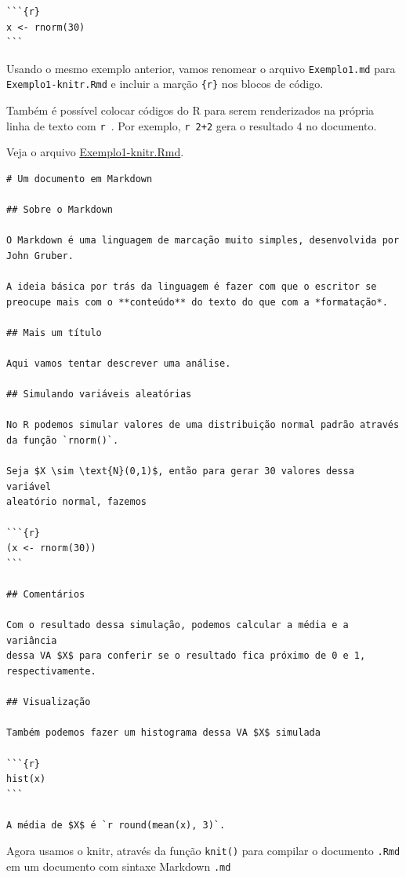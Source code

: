\documentclass[10pt,a4paper]{book}
\begin{document}
\begin{verbatim}
```{r}
x <- rnorm(30)
```
\end{verbatim}

Usando o mesmo exemplo anterior, vamos renomear o arquivo
\texttt{Exemplo1.md} para \texttt{Exemplo1-knitr.Rmd} e incluir a marção
\texttt{\{r\}} nos blocos de código.

Também é possível colocar códigos do R para serem renderizados na
própria linha de texto com
\texttt{\textasciigrave{}r\ \textasciigrave{}}. Por exemplo,
\texttt{\textasciigrave{}r\ 2+2\textasciigrave{}} gera o resultado 4 no
documento.

Veja o arquivo \href{exemplos/Exemplo1-knitr.Rmd}{Exemplo1-knitr.Rmd}.

\begin{verbatim}
# Um documento em Markdown

## Sobre o Markdown

O Markdown é uma linguagem de marcação muito simples, desenvolvida por
John Gruber.

A ideia básica por trás da linguagem é fazer com que o escritor se
preocupe mais com o **conteúdo** do texto do que com a *formatação*.

## Mais um título

Aqui vamos tentar descrever uma análise.

## Simulando variáveis aleatórias

No R podemos simular valores de uma distribuição normal padrão através
da função `rnorm()`.

Seja $X \sim \text{N}(0,1)$, então para gerar 30 valores dessa variável
aleatório normal, fazemos

```{r}
(x <- rnorm(30))
```

## Comentários

Com o resultado dessa simulação, podemos calcular a média e a variância
dessa VA $X$ para conferir se o resultado fica próximo de 0 e 1,
respectivamente.

## Visualização

Também podemos fazer um histograma dessa VA $X$ simulada

```{r}
hist(x)
```

A média de $X$ é `r round(mean(x), 3)`.
\end{verbatim}

Agora usamos o knitr, através da função \texttt{knit()} para compilar o
documento \texttt{.Rmd} em um documento com sintaxe Markdown
\texttt{.md}
\end{document}
